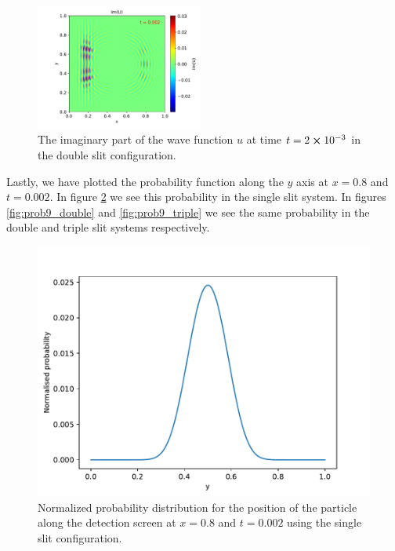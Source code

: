\documentclass[english,notitlepage,reprint,nofootinbib]{revtex4-2}  %
\begin{document}
	\begin{figure}[H]
		\centering
		\includegraphics[width=0.49\textwidth]{figures/problem8_U_Im_0.002.pdf}
		\caption{The imaginary part of the wave function $u$ at time $t = 2\cross10^{-3}$ in the double slit configuration.}
		\label{fig:prob8_Im2}
	\end{figure}

	\noindent
	Lastly, we have plotted the probability function along the $y$ axis at $x = 0.8$
	and $t= 0.002$. In figure \ref{fig:prob9_single} we see this probability in the single 
	slit system. In figures \ref{fig:prob9_double} and \ref{fig:prob9_triple} we see the same probability
	in the double and triple slit systems respectively.
	\begin{figure}[h!]
		\centering
		\includegraphics[scale=0.55]{figures/problem9_single_slit.pdf}
		\caption{Normalized probability distribution for the position of the particle along the detection screen at $x = 0.8$ and $t = 0.002$ using the single slit configuration.}
		\label{fig:prob9_single}
	\end{figure}
	
\end{document}
